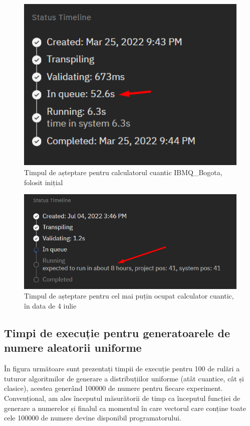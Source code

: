 \begin{figure}[H]
    \centering
    \includegraphics[width=1.0\textwidth]{continut/capitol4/figuri/WaitTime1.png}
    \caption{Timpul de așteptare pentru calculatorul cuantic IBMQ\_Bogota, folosit inițial}
    \label{fig:WaitTime1}
\end{figure}

\begin{figure}[H]
    \centering
    \includegraphics[width=1.0\textwidth]{continut/capitol4/figuri/WaitTime2.png}
    \caption{Timpul de așteptare pentru cel mai puțin ocupat calculator cuantic, în data de 4 iulie}
    \label{fig:WaitTime2}
\end{figure}

\subsection{Timpi de execuție pentru generatoarele de numere aleatorii uniforme}

În figura următoare sunt prezentați timpii de execuție pentru 100 de rulări a tuturor algoritmilor de generare a distribuțiilor uniforme (atât cuantice, cât și clasice), acestea generând 100000 de numere pentru fiecare experiment. Convențional, am ales începutul măsurătorii de timp ca începutul funcției de generare a numerelor și finalul ca momentul în care vectorul care conține toate cele 100000 de numere devine disponibil programatorului.

